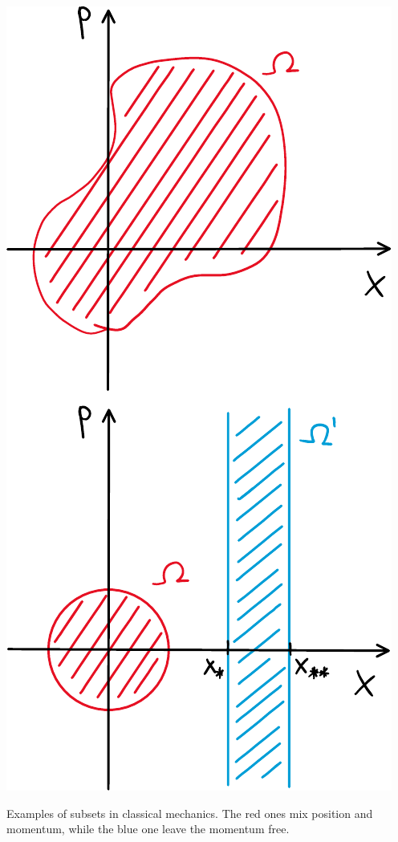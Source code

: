 \documentclass[../main.tex]{subfiles}
\begin{document}
\begin{marginfigure}
	\includegraphics{images/subset_class_mech.pdf}
	\caption[Examples of subset in CM]{Examples of subsets in classical mechanics. The red ones mix position and momentum, while the blue one leave the momentum free.}
\end{marginfigure}
\end{document}
